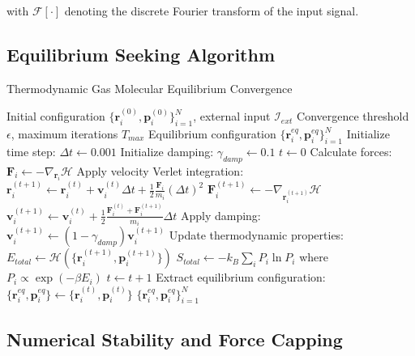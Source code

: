 \documentclass[11pt,a4paper]{article}
\begin{document}
with $\mathcal{F}[\cdot]$ denoting the discrete Fourier transform of the input signal.

\subsection{Equilibrium Seeking Algorithm}

\begin{algorithm}
\caption{Thermodynamic Gas Molecular Equilibrium Convergence}
\label{alg:equilibrium-seeking}
\begin{algorithmic}[1]
\REQUIRE Initial configuration $\{\mathbf{r}_i^{(0)}, \mathbf{p}_i^{(0)}\}_{i=1}^N$, external input $\mathcal{I}_{ext}$
\REQUIRE Convergence threshold $\epsilon$, maximum iterations $T_{max}$
\ENSURE Equilibrium configuration $\{\mathbf{r}_i^{eq}, \mathbf{p}_i^{eq}\}_{i=1}^N$
\STATE Initialize time step: $\Delta t \leftarrow 0.001$
\STATE Initialize damping: $\gamma_{damp} \leftarrow 0.1$
\STATE $t \leftarrow 0$
        \STATE Calculate forces: $\mathbf{F}_i \leftarrow -\nabla_{\mathbf{r}_i} \mathcal{H}$
        \STATE Apply velocity Verlet integration:
        \STATE $\mathbf{r}_i^{(t+1)} \leftarrow \mathbf{r}_i^{(t)} + \mathbf{v}_i^{(t)} \Delta t + \frac{1}{2} \frac{\mathbf{F}_i}{m_i} (\Delta t)^2$
        \STATE $\mathbf{F}_i^{(t+1)} \leftarrow -\nabla_{\mathbf{r}_i^{(t+1)}} \mathcal{H}$
        \STATE $\mathbf{v}_i^{(t+1)} \leftarrow \mathbf{v}_i^{(t)} + \frac{1}{2} \frac{\mathbf{F}_i^{(t)} + \mathbf{F}_i^{(t+1)}}{m_i} \Delta t$
        \STATE Apply damping: $\mathbf{v}_i^{(t+1)} \leftarrow (1 - \gamma_{damp}) \mathbf{v}_i^{(t+1)}$
    \ENDFOR
    \STATE Update thermodynamic properties:
    \STATE $E_{total} \leftarrow \mathcal{H}(\{\mathbf{r}_i^{(t+1)}, \mathbf{p}_i^{(t+1)}\})$
    \STATE $S_{total} \leftarrow -k_B \sum_i P_i \ln P_i$ where $P_i \propto \exp(-\beta E_i)$
    \STATE $t \leftarrow t + 1$
\ENDWHILE
\STATE Extract equilibrium configuration: $\{\mathbf{r}_i^{eq}, \mathbf{p}_i^{eq}\} \leftarrow \{\mathbf{r}_i^{(t)}, \mathbf{p}_i^{(t)}\}$
\RETURN $\{\mathbf{r}_i^{eq}, \mathbf{p}_i^{eq}\}_{i=1}^N$
\end{algorithmic}
\end{algorithm}

\subsection{Numerical Stability and Force Capping}
\end{document}
